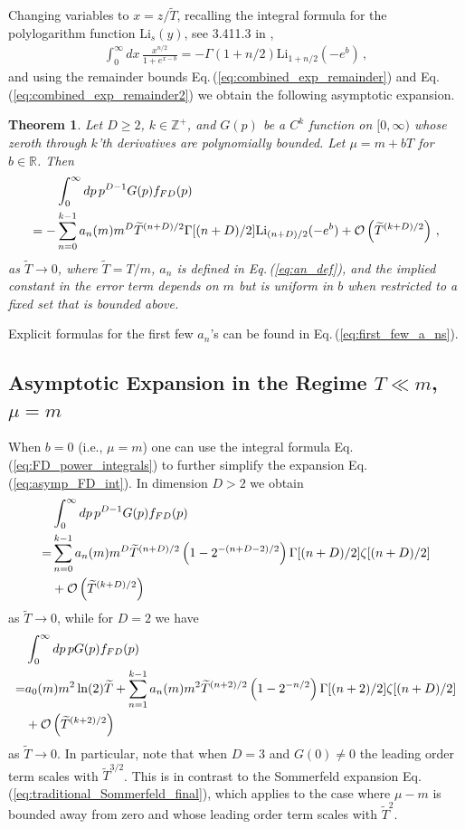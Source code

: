 \documentclass[sn-mathphys,Numbered]{sn-jnl}
\newcommand{\req}[1]{Eq.\,(\ref{#1})}
\newtheorem{theorem}{Theorem}
\begin{document}
Changing variables to $x=z/\widetilde{T}$, recalling the integral formula for the polylogarithm function $\mathrm{Li}_s(y)$, see 3.411.3 in \cite{Gradshteyn:1943cpj},
\begin{align}\label{eq:h_decomp_eval}
 \int_0^\infty dx \, \frac{x^{n/2}}{1+e^{x-b}} =-\Gamma(1+n/2)\mathrm{Li}_{1+n/2}(-e^b)\,,
\end{align}
and using the remainder bounds \req{eq:combined_exp_remainder} and \req{eq:combined_exp_remainder2} we obtain the following asymptotic expansion.
\begin{theorem}\label{thm:asymp_FD_int_Delta_mu_small}
Let $D\geq 2$, $k\in\mathbb{Z}^+$, and $G(p)$ be a $C^k$ function on $[0,\infty)$ whose zeroth through $k$'th derivatives are polynomially bounded. Let $\mu=m+bT$ for $b\in\mathbb{R}$. Then
\begin{align}\label{eq:asymp_FD_int}
&\int_0^\infty dp\, p^{D-1} G(p) f_{FD}(p)\notag\\
 =-&\sum_{n=0}^{k-1} a_n(m)m^{D}\widetilde{T}^{(n+D)/2}\Gamma[(n+D)/2]\mathrm{Li}_{(n+D)/2}(-e^b)+\mathcal{O}\left(\widetilde{T}^{(k+D)/2}\right)\,,
\end{align}
as $\widetilde{T}\to 0$, where $\widetilde{T}=T/m$, $a_n$ is defined in \req{eq:an_def}, and the implied constant in the error term depends on $m$ but is uniform in $b$ when restricted to a fixed set that is bounded above. 
\end{theorem}
Explicit formulas for the first few $a_n$'s can be found in \req{eq:first_few_a_ns}.
\subsection{Asymptotic Expansion in the Regime $T\ll m$, $\mu=m$}\label{sec:b_0}
When $b=0$ (i.e., $\mu=m$) one can use the integral formula \req{eq:FD_power_integrals} to further simplify the expansion \req{eq:asymp_FD_int}. In dimension $D>2$ we obtain
\begin{align}\label{eq:asymp_FD_int_b_0}
&\int_0^\infty dp\, p^{D-1} G(p) f_{FD}(p)\notag\\
 =&\sum_{n=0}^{k-1} a_n(m)m^{D}\widetilde{T}^{(n+D)/2}\left(1-2^{-(n+D-2)/2}\right)\Gamma[(n+D)/2]\zeta[(n+D)/2]\\
 &+\mathcal{O}\left(\widetilde{T}^{(k+D)/2}\right)\notag
\end{align}
as $\widetilde{T}\to 0$, while for $D=2$ we have
\begin{align}\label{eq:asymp_FD_int_b_D2}
&\int_0^\infty dp\, p G(p) f_{FD}(p)\notag\\
 =& a_0(m)m^2 \ln(2)\widetilde{T}+ 
 \sum_{n=1}^{k-1} a_n(m)m^{2}\widetilde{T}^{(n+2)/2}\left(1-2^{-n/2}\right)\Gamma[(n+2)/2]\zeta[(n+D)/2]\\
 &+\mathcal{O}\left(\widetilde{T}^{(k+2)/2}\right)\notag
\end{align}
as $\widetilde{T}\to 0$. In particular, note that when $D=3$ and $G(0)\neq 0$ the leading order term scales with $\widetilde{T}^{3/2}$. This is in contrast to the Sommerfeld expansion \req{eq:traditional_Sommerfeld_final}, which applies to the case where $\mu-m$ is bounded away from zero and whose leading order term scales with $\widetilde{T}^2$.
\end{document}
